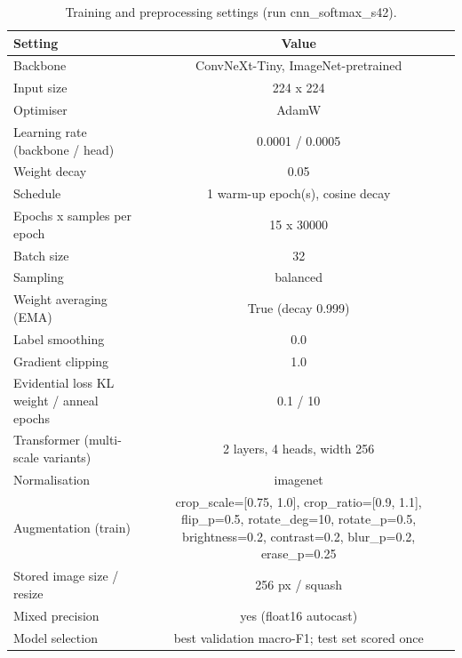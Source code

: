\begin{table}[t]
\centering
\small
\caption{Training and preprocessing settings (run cnn\_softmax\_s42).}
\label{tab:impl}
\begin{tabular}{lc}
\toprule
Setting & Value \\
\midrule
Backbone & ConvNeXt-Tiny, ImageNet-pretrained \\
Input size & 224 x 224 \\
Optimiser & AdamW \\
Learning rate (backbone / head) & 0.0001 / 0.0005 \\
Weight decay & 0.05 \\
Schedule & 1 warm-up epoch(s), cosine decay \\
Epochs x samples per epoch & 15 x 30000 \\
Batch size & 32 \\
Sampling & balanced \\
Weight averaging (EMA) & True (decay 0.999) \\
Label smoothing & 0.0 \\
Gradient clipping & 1.0 \\
Evidential loss KL weight / anneal epochs & 0.1 / 10 \\
Transformer (multi-scale variants) & 2 layers, 4 heads, width 256 \\
Normalisation & imagenet \\
Augmentation (train) & crop\_scale=[0.75, 1.0], crop\_ratio=[0.9, 1.1], flip\_p=0.5, rotate\_deg=10, rotate\_p=0.5, brightness=0.2, contrast=0.2, blur\_p=0.2, erase\_p=0.25 \\
Stored image size / resize & 256 px / squash \\
Mixed precision & yes (float16 autocast) \\
Model selection & best validation macro-F1; test set scored once \\
\bottomrule
\end{tabular}
\end{table}